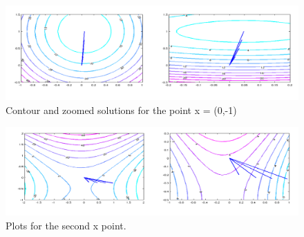 \documentclass[eng,openany]{mgr}
\begin{document}
\begin{figure}[h]
\centering
\includegraphics[width=0.9\linewidth]{screenshot023}
\caption{Contour and zoomed solutions for the point x = (0,-1)}
\label{fig:screenshot023}
\end{figure}
\begin{figure}[h]
\centering
\includegraphics[width=0.9\linewidth]{screenshot024}
\caption{Plots for the second x point.}
\label{fig:screenshot024}
\end{figure}
\end{document}
